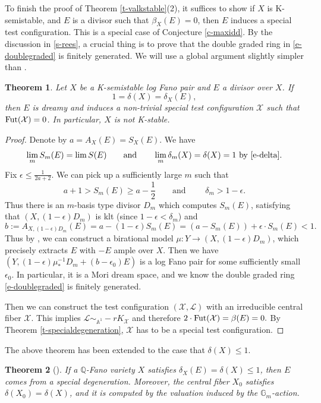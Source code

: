 \documentclass[12pt,reqno]{amsart}%
\newcommand{\bA}{{\mathbb{A} }}
\newcommand{\bG}{{\mathbb{G} }}
\newcommand{\cX}{{\mathcal{X}}}
\newcommand{\cL}{{\mathcal{L}}}
\newtheorem{thm}{Theorem}[section]
\theoremstyle{definition}
\theoremstyle{remark}
\newcommand{\Fut}{{\rm Fut}}
\renewcommand{\d}{\delta}
\begin{document}
 To finish the proof of Theorem \ref{t-valkstable}(2), it suffices to show if $X$ is K-semistable, and $E$ is a divisor such that $\beta_X(E)=0$, then $E$ induces a special test configuration. This is a special case of Conjecture \ref{c-maxidd}.
By the discussion in \ref{s-rees}, a crucial thing is to prove that the double graded ring in \eqref{e-doublegraded} is finitely generated. We will use a global argument slightly simpler than \cite[Section 4.1]{BX19}.

\begin{thm}\label{t-delta=1}
Let $X$ be a K-semistable log Fano pair and $E$ a divisor over $X$. If  
\[
1 = \delta(X) =\delta_X(E),
\] then $E$ is dreamy and induces a non-trivial special test configuration $\cX$ such that $\Fut(\cX)=0$. In particular, $X$ is not K-stable.  
\end{thm}
\begin{proof}
Denote by $a=A_{X}(E)=S_X(E)$. 
We have 
$$\lim_m S_m(E)=\lim S(E) \qquad \mbox{and} \qquad \lim_m \delta_m(X)= \delta(X)=1 \mbox{ by \eqref{e-delta}}.$$
Fix $\epsilon\le \frac{1}{2 a+2}$. We can pick up a sufficiently large  $m$  such that 
$$a+1> S_m(E)\ge a-\frac{1}{2}\qquad \mbox{and }\qquad \delta_m> 1-\epsilon.$$ 
Thus there is an $m$-basis type divisor $D_m$ which computes $S_m(E)$, satisfying that $(X, (1-\epsilon)D_m)$ is klt (since $1-\epsilon<\delta_m$) and 
$$b:=A_{X,(1-\epsilon)D_m}(E)=a-(1-\epsilon)S_m(E)=(a-S_m(E))+\epsilon\cdot S_m(E)<1.$$ 
Thus by \cite{BCHM10}, we can construct a birational model $\mu\colon Y\to (X,(1-\epsilon)D_m)$, which precisely extracts $E$ with $-E$ ample over $X$. Then we have $(Y,(1-\epsilon)\mu_*^{-1}D_m+(b-\epsilon_0)E)$ is a log Fano pair for some sufficiently small $\epsilon_0$. In particular, it is a Mori dream space, and we know the double graded ring
\eqref{e-doublegraded} is finitely generated. 

Then we can construct the test configuration $(\cX,\cL)$ with an irreducible central fiber $\cX$. This implies $\cL\sim_{\bA^1} -rK_{\cX}$ and therefore  
$2\cdot \Fut(\cX)=\beta(E)=0.$ By Theorem \ref{t-specialdegeneration}, $\cX$ has to be a special test configuration. 
\end{proof}

The above theorem has been extended to the case that $\d(X)\le 1$.
\begin{thm}[{\cite{BLZ19}}]\label{t-blzdegeneration} If a $\mathbb{Q}$-Fano variety $X$ satisfies $\delta_X(E)=\delta(X)\le 1$, then $E$ comes from a special degeneration. Moreover, the central fiber $X_0$ satisfies $\delta(X_0)=\delta(X)$, and it is computed by the valuation induced by the $\bG_m$-action. 
\end{thm}
\end{document}
